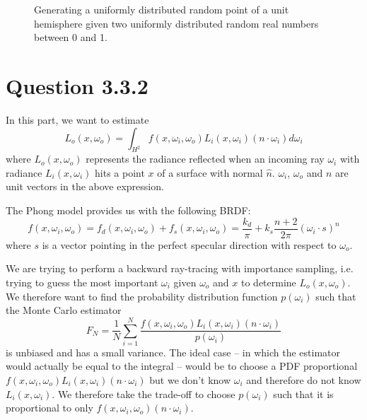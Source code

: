 \documentclass{article}
\begin{document}
\begin{figure}[h]
\centering
{}
\caption{Generating a uniformly distributed random point of a unit hemisphere given two uniformly distributed random real numbers between 0 and 1.}
\label{fig:hemisphere}
\end{figure}

\section*{Question 3.3.2}
In this part, we want to estimate
$$
L_o(x, \omega_o) = \int_{H^2}f(x, \omega_i, \omega_o)L_i(x, \omega_i)(n \cdot \omega_i)d\omega_i
$$
where $L_o(x, \omega_o)$ represents the radiance reflected when an incoming ray $\omega_i$ with radiance $L_i(x, \omega_i)$ hits a point $x$ of a surface with normal $\hat n$. $\omega_i$, $\omega_o$ and $n$ are unit vectors in the above expression.

The Phong model provides us with the following BRDF:
$$
f(x, \omega_i, \omega_o) = f_d(x, \omega_i, \omega_o) + f_s(x, \omega_i, \omega_o) = \frac{k_d}{\pi} + k_s\frac{n + 2}{2\pi}(\omega_i \cdot s)^n
$$
where $s$ is a vector pointing in the perfect specular direction with respect to $\omega_o$.

We are trying to perform a backward ray-tracing with importance sampling, i.e. trying to guess the most important $\omega_i$ given $\omega_o$ and $x$ to determine $L_o(x, \omega_o)$. We therefore want to find the probability distribution function $p(\omega_i)$ such that the Monte Carlo estimator
$$F_N = \frac{1}{N}\sum\limits_{i=1}^N\frac{f(x, \omega_i, \omega_o)L_i(x, \omega_i)(n \cdot \omega_i)}{p(\omega_i)}
$$
is unbiased and has a small variance. The ideal case -- in which the estimator would actually be equal to the integral -- would be to choose a PDF proportional $f(x, \omega_i, \omega_o)L_i(x, \omega_i)(n \cdot \omega_i)$ but we don't know $\omega_i$ and therefore do not know $L_i(x, \omega_i)$. We therefore take the trade-off to choose $p(\omega_i)$ such that it is proportional to only $f(x, \omega_i, \omega_o)(n \cdot \omega_i)$. 
\end{document}
